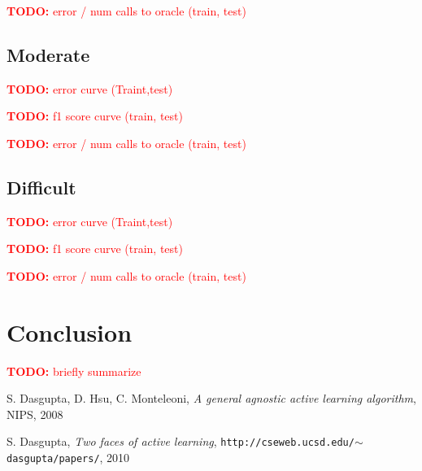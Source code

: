 \documentclass[paper=a4, fontsize=11pt]{scrartcl}
\newcommand{\TODO}[1]{\textcolor{red}{\textbf{TODO: } #1}}
\numberwithin{equation}{section}		%
\numberwithin{figure}{section}			%
\numberwithin{table}{section}				%
\begin{document}
\TODO{error / num calls to oracle (train, test) }

\subsection{Moderate}


\TODO{error curve (Traint,test)}

\TODO{f1 score curve (train, test)}

\TODO{error / num calls to oracle (train, test) }


\subsection{Difficult}


\TODO{error curve (Traint,test)}

\TODO{f1 score curve (train, test)}

\TODO{error / num calls to oracle (train, test) }


\section{Conclusion}

\TODO{briefly summarize}


\begin{thebibliography}{1}


S. Dasgupta, D. Hsu, C. Monteleoni, \emph{A general agnostic active learning algorithm}, NIPS, 2008 

S. Dasgupta, \emph{Two faces of active learning}, \texttt{http://cseweb.ucsd.edu/$\sim$dasgupta/papers/}, 2010

\end{thebibliography}
\end{document}
